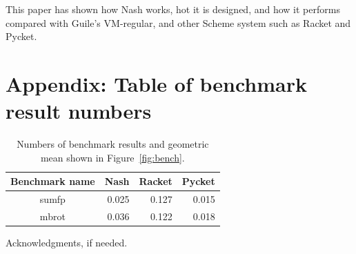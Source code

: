 \documentclass[preprint, numbers]{sigplanconf}
\begin{document}
This paper has shown how Nash works, hot it is designed, and how it performs
compared with Guile's VM-regular, and other Scheme system such as Racket and
Pycket.

\appendix
\section{Appendix: Table of benchmark result numbers}
\label{app:benchnumbers}

\begin{table}
  \centering
  \begin{tabular}{crrr}
    \toprule
    Benchmark name & Nash & Racket & Pycket\\
    \midrule
    sumfp & 0.025 & 0.127 & 0.015 \\
    mbrot & 0.036 & 0.122 & 0.018 \\
    \bottomrule
  \end{tabular}
  \caption{Numbers of benchmark results and geometric mean shown in
    Figure~\hyperref[fig:bench]{\ref{fig:bench}}.}
\end{table}


\acks
Acknowledgments, if needed.




\end{document}
